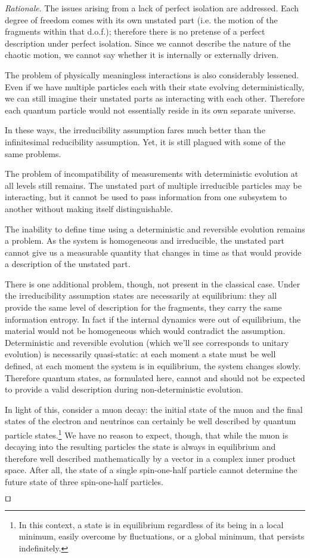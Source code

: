 \documentclass[smallextended]{svjour3}
\numberwithin{equation}{section}
\newenvironment{rationale}{\emph{Rationale}.}{\hfill\(\qed\)}
\theoremstyle{definition}
\newenvironment{rationale}{\emph{Rationale}.}{\qed}
\begin{document}
\begin{rationale}
	The issues arising from a lack of perfect isolation are addressed. Each degree of freedom comes with its own unstated part (i.e. the motion of the fragments within that d.o.f.); therefore there is no pretense of a perfect description under perfect isolation. Since we cannot describe the nature of the chaotic motion, we cannot say whether it is internally or externally driven.
	
	The problem of physically meaningless interactions is also considerably lessened. Even if we have multiple particles each with their state evolving deterministically, we can still imagine their unstated parts as interacting with each other. Therefore each quantum particle would not essentially reside in its own separate universe.
	
	In these ways, the irreducibility assumption fares much better than the infinitesimal reducibility assumption. Yet, it is still plagued with some of the same problems.
	
	The problem of incompatibility of measurements with deterministic evolution at all levels still remains. The unstated part of multiple irreducible particles may be interacting, but it cannot be used to pass information from one subsystem to another without making itself distinguishable.
	
	The inability to define time using a deterministic and reversible evolution remains a problem. As the system is homogeneous and irreducible, the unstated part cannot give us a measurable quantity that changes in time as that would provide a description of the unstated part.
	
	There is one additional problem, though, not present in the classical case. Under the irreducibility assumption states are necessarily at equilibrium: they all provide the same level of description for the fragments, they carry the same information entropy. In fact if the internal dynamics were out of equilibrium, the material would not be homogeneous which would contradict the assumption. Deterministic and reversible evolution (which we'll see corresponds to unitary evolution) is necessarily quasi-static: at each moment a state must be well defined, at each moment the system is in equilibrium, the system changes slowly. Therefore quantum states, as formulated here, cannot and should not be expected to provide a valid description during non-deterministic evolution.
	
	In light of this, consider a muon decay: the initial state of the muon and the final states of the electron and neutrinos can certainly be well described by quantum particle states.\footnote{In this context, a state is in equilibrium regardless of its being in a local minimum, easily overcome by fluctuations, or a global minimum, that persists indefinitely.} We have no reason to expect, though, that while the muon is decaying into the resulting particles the state is always in equilibrium and therefore well described mathematically by a vector in a complex inner product space. After all, the state of a single spin-one-half particle cannot determine the future state of three spin-one-half particles.
	

\end{rationale}
\end{document}
